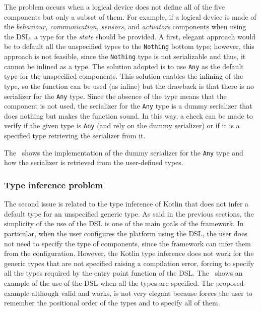 The problem occurs when a logical device does not define all of the five components but only a subset of them.
For example, if a logical device is made of the \emph{behaviour, communication, sensors,} and \emph{actuators} components when using the DSL, a type
for the \emph{state} should be provided. A first, elegant approach would be to default all the unspecified types to the \texttt{Nothing} bottom type;
however, this approach is not feasible, since the \texttt{Nothing} type is not serializable and thus, it cannot be inlined as a type.
The solution adopted is to use \texttt{Any} as the default type for the unspecified components. This solution enables the inlining of the type,
so the function can be used (as inline) but the drawback is that there is no serializer for the \texttt{Any} type.
Since the absence of the type means that the component is not used, the serializer for the \texttt{Any} type is a dummy serializer that does nothing
but makes the function sound. In this way, a check can be made to verify if the given type is \texttt{Any} (and rely on the dummy serializer) or
if it is a specified type retrieving the serializer from it.



The~ shows the implementation of the dummy serializer for the \texttt{Any} type and how the serializer is retrieved from the
user-defined types.

\subsubsection{Type inference problem}

The second issue is related to the type inference of Kotlin that does not infer a default type for an unspecified generic type.
As said in the previous sections, the simplicity of the use of the DSL is one of the main goals of the framework. In particular, when the user
configures the platform using the DSL, the user does not need to specify the type of components, since the framework can infer them from the
configuration. However, the Kotlin type inference does not work for the generic types that are not specified raising a compilation error, forcing
to specify all the types required by the entry point function of the DSL. The~ shows an example of the use of the
DSL when all the types are specified. The proposed example although valid and works, is not very elegant because forces the user to remember
the positional order of the types and to specify all of them.

